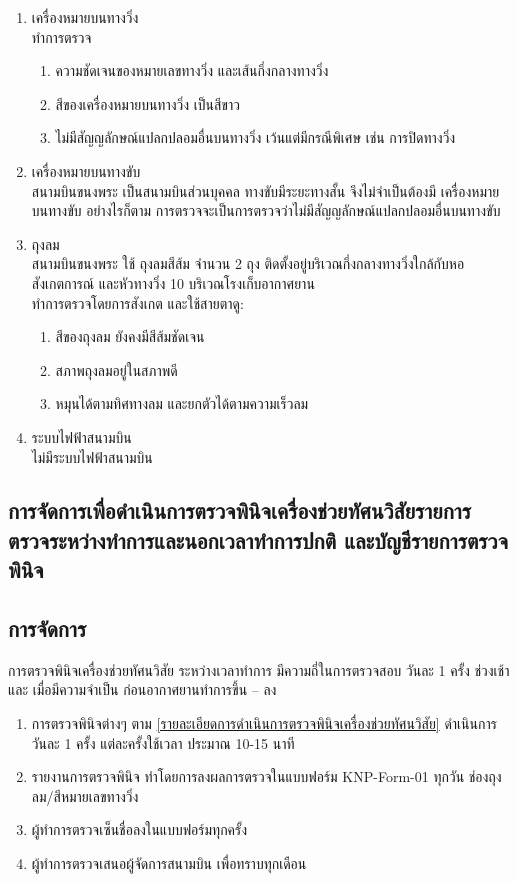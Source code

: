 \begin{enumerate}
\item เครื่องหมายบนทางวิ่ง \\
	ทำการตรวจ
	\begin{enumerate}
	\item ความชัดเจนของหมายเลขทางวิ่ง และเส้นกึ่งกลางทางวิ่ง
	\item สีของเครื่องหมายบนทางวิ่ง เป็นสีขาว
	\item ไม่มีสัญญลักษณ์แปลกปลอมอื่นบนทางวิ่ง เว้นแต่มีกรณีพิเศษ เช่น การปิดทางวิ่ง
	\end{enumerate}
\item เครื่องหมายบนทางขับ \\
	สนามบินขนงพระ เป็นสนามบินส่วนบุคคล ทางขับมีระยะทางสั้น จึงไม่จำเป็นต้องมี เครื่องหมายบนทางขับ อย่างไรก็ตาม การตรวจจะเป็นการตรวจว่าไม่มีสัญญลักษณ์แปลกปลอมอื่นบนทางขับ
\item ถุงลม \\
	สนามบินขนงพระ ใช้ ถุงลมสีส้ม จำนวน 2 ถุง ติดตั้งอยู่บริเวณกึ่งกลางทางวิ่งใกล้กับหอสังเกตการณ์ และหัวทางวิ่ง 10 บริเวณโรงเก็บอากาศยาน \\
	
ทำการตรวจโดยการสังเกต และใช้สายตาดู:
	\begin{enumerate}
	\item สีของถุงลม ยังคงมีสีส้มชัดเจน
	\item สภาพถุงลมอยู่ในสภาพดี 
	\item หมุนได้ตามทิศทางลม และยกตัวได้ตามความเร็วลม
	\end{enumerate}
\item ระบบไฟฟ้าสนามบิน \\
	ไม่มีระบบไฟฟ้าสนามบิน
\end{enumerate}

\subsection{การจัดการเพื่อดำเนินการตรวจพินิจเครื่องช่วยทัศนวิสัยรายการตรวจระหว่างทำการและนอกเวลาทำการปกติ และบัญชีรายการตรวจพินิจ}

\subsection{การจัดการ}

การตรวจพินิจเครื่องช่วยทัศนวิสัย  ระหว่างเวลาทำการ มีความถี่ในการตรวจสอบ วันละ 1 ครั้ง ช่วงเช้า และ เมื่อมีความจำเป็น ก่อนอากาศยานทำการขึ้น – ลง

\begin{enumerate}
\item การตรวจพินิจต่างๆ ตาม \ref{รายละเอียดการดำเนินการตรวจพินิจเครื่องช่วยทัศนวิสัย} ดำเนินการ วันละ 1 ครั้ง แต่ละครั้งใช้เวลา ประมาณ 10-15 นาที
\item รายงานการตรวจพินิจ ทำโดยการลงผลการตรวจในแบบฟอร์ม KNP-Form-01  ทุกวัน ช่องถุงลม/สีหมายเลขทางวิ่ง
\item ผู้ทำการตรวจเซ็นชื่อลงในแบบฟอร์มทุกครั้ง
\item ผู้ทำการตรวจเสนอผู้จัดการสนามบิน เพื่อทราบทุกเดือน
\end{enumerate}

